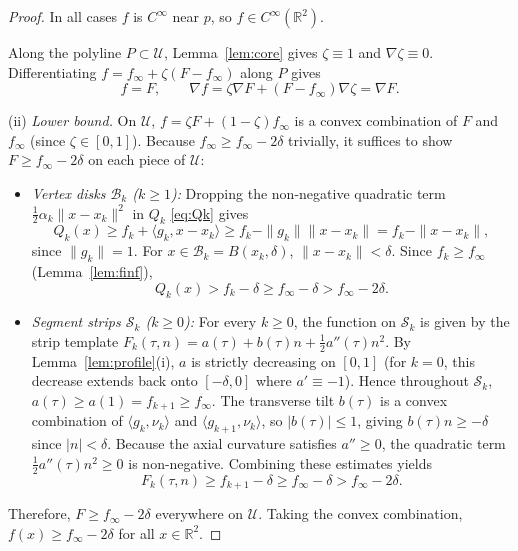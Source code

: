 \documentclass[10pt,a4paper]{amsart}
\newcommand{\R}{\mathbb{R}}
\newcommand{\ip}[2]{\langle #1,#2\rangle}
\begin{document}
\begin{proof}
In all cases $f$ is $C^\infty$ near $p$, so $f\in C^\infty(\R^2)$.

Along the polyline $P \subset \mathcal U$, Lemma~\ref{lem:core} gives $\zeta \equiv 1$ and $\nabla\zeta \equiv 0$.
Differentiating $f = f_\infty + \zeta(F - f_\infty)$ along $P$ gives
\[
f = F, \qquad \nabla f = \zeta\nabla F + (F - f_\infty)\nabla\zeta = \nabla F.
\]

(ii) \emph{Lower bound.}
On $\mathcal U$, $f = \zeta F + (1-\zeta)f_\infty$ is a convex combination of $F$ and $f_\infty$ (since $\zeta \in [0, 1]$).
Because $f_\infty \ge f_\infty - 2\delta$ trivially, it suffices to show $F \ge f_\infty - 2\delta$ on each piece of $\mathcal U$:
\begin{itemize}
\item \emph{Vertex disks $\mathcal B_k$ ($k\ge 1$):}
Dropping the non-negative quadratic term $\frac12\alpha_k\|x-x_k\|^2$ in $Q_k$ \eqref{eq:Qk} gives
\[
Q_k(x) \ge f_k + \ip{g_k}{x-x_k} \ge f_k - \|g_k\|\|x-x_k\| = f_k - \|x-x_k\|,
\]
since $\|g_k\| = 1$.
For $x \in \mathcal B_k = B(x_k, \delta)$, $\|x-x_k\| < \delta$.
Since $f_k \ge f_\infty$ (Lemma~\ref{lem:finf}),
\[
Q_k(x) > f_k - \delta \ge f_\infty - \delta > f_\infty - 2\delta.
\]

\item \emph{Segment strips $\mathcal S_k$ ($k\ge 0$):}
For every $k\ge 0$, the function on $\mathcal S_k$ is given by the strip template $F_k(\tau, n) = a(\tau) + b(\tau)n + \frac12 a''(\tau)n^2$.
By Lemma~\ref{lem:profile}(i), $a$ is strictly decreasing on $[0, 1]$ (for $k=0$, this decrease extends back onto $[-\delta, 0]$ where $a' \equiv -1$).
Hence throughout $\mathcal S_k$, $a(\tau) \ge a(1) = f_{k+1} \ge f_\infty$.
The transverse tilt $b(\tau)$ is a convex combination of $\ip{g_k}{\nu_k}$ and $\ip{g_{k+1}}{\nu_k}$, so $|b(\tau)| \le 1$, giving $b(\tau)n \ge -\delta$ since $|n| < \delta$.
Because the axial curvature satisfies $a'' \ge 0$, the quadratic term $\frac12 a''(\tau)n^2 \ge 0$ is non-negative.
Combining these estimates yields
\[
F_k(\tau, n) \ge f_{k+1} - \delta \ge f_\infty - \delta > f_\infty - 2\delta.
\]
\end{itemize}
Therefore, $F \ge f_\infty - 2\delta$ everywhere on $\mathcal U$.
Taking the convex combination, $f(x) \ge f_\infty - 2\delta$ for all $x \in \R^2$.


\end{proof}
\end{document}
